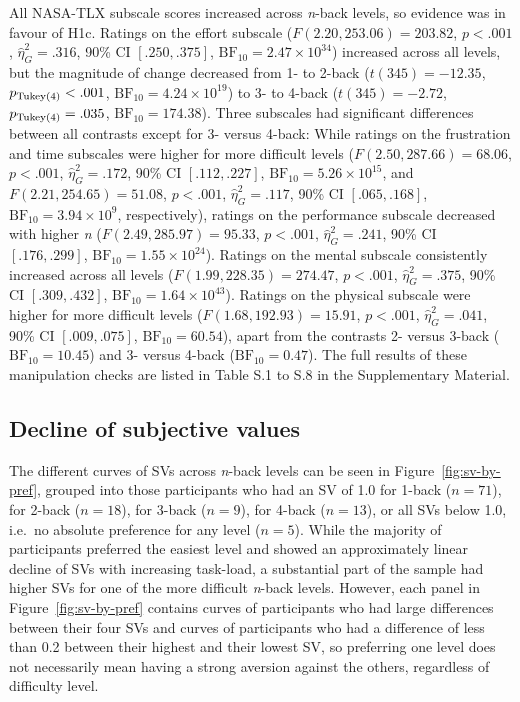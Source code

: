 \documentclass[
  man,floatsintext]{apa6}
\begin{document}
All NASA-TLX subscale scores increased across \emph{n}-back levels, so evidence was in favour of H1c.
Ratings on the effort subscale (\(F(2.20, 253.06) = 203.82\), \(p < .001\), \(\hat{\eta}^2_G = .316\), 90\% CI \([.250, .375]\), \(\mathrm{BF}_{\textrm{10}} = 2.47 \times 10^{34}\)) increased across all levels, but the magnitude of change decreased from 1- to 2-back (\(t(345) = -12.35\), \(p_\mathrm{\scriptsize Tukey(4)} < .001\), \(\mathrm{BF}_{\textrm{10}} = 4.24 \times 10^{19}\)) to 3- to 4-back (\(t(345) = -2.72\), \(p_\mathrm{\scriptsize Tukey(4)} = .035\), \(\mathrm{BF}_{\textrm{10}} = 174.38\)).
Three subscales had significant differences between all contrasts except for 3- versus 4-back:
While ratings on the frustration and time subscales were higher for more difficult levels (\(F(2.50, 287.66) = 68.06\), \(p < .001\), \(\hat{\eta}^2_G = .172\), 90\% CI \([.112, .227]\), \(\mathrm{BF}_{\textrm{10}} = 5.26 \times 10^{15}\), and \(F(2.21, 254.65) = 51.08\), \(p < .001\), \(\hat{\eta}^2_G = .117\), 90\% CI \([.065, .168]\), \(\mathrm{BF}_{\textrm{10}} = 3.94 \times 10^{9}\), respectively), ratings on the performance subscale decreased with higher \emph{n} (\(F(2.49, 285.97) = 95.33\), \(p < .001\), \(\hat{\eta}^2_G = .241\), 90\% CI \([.176, .299]\), \(\mathrm{BF}_{\textrm{10}} = 1.55 \times 10^{24}\)).
Ratings on the mental subscale consistently increased across all levels (\(F(1.99, 228.35) = 274.47\), \(p < .001\), \(\hat{\eta}^2_G = .375\), 90\% CI \([.309, .432]\), \(\mathrm{BF}_{\textrm{10}} = 1.64 \times 10^{43}\)).
Ratings on the physical subscale were higher for more difficult levels (\(F(1.68, 192.93) = 15.91\), \(p < .001\), \(\hat{\eta}^2_G = .041\), 90\% CI \([.009, .075]\), \(\mathrm{BF}_{\textrm{10}} = 60.54\)), apart from the contrasts 2- versus 3-back (\(\mathrm{BF}_{\textrm{10}} = 10.45\)) and 3- versus 4-back (\(\mathrm{BF}_{\textrm{10}} = 0.47\)).
The full results of these manipulation checks are listed in Table S.1 to S.8 in the Supplementary Material.

\hypertarget{decline-of-subjective-values}{%
\subsection{Decline of subjective values}\label{decline-of-subjective-values}}

The different curves of SVs across \emph{n}-back levels can be seen in Figure~\ref{fig:sv-by-pref}, grouped into those participants who had an SV of 1.0 for 1-back (\(n=71\)), for 2-back (\(n=18\)), for 3-back (\(n=9\)), for 4-back (\(n=13\)), or all SVs below 1.0, i.e.~no absolute preference for any level (\(n=5\)).
While the majority of participants preferred the easiest level and showed an approximately linear decline of SVs with increasing task-load, a substantial part of the sample had higher SVs for one of the more difficult \emph{n}-back levels.
However, each panel in Figure~\ref{fig:sv-by-pref} contains curves of participants who had large differences between their four SVs and curves of participants who had a difference of less than 0.2 between their highest and their lowest SV, so preferring one level does not necessarily mean having a strong aversion against the others, regardless of difficulty level.
\end{document}

